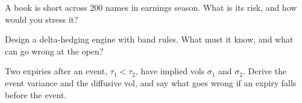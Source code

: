 \begin{interviewq}\label{iq:s2:gamma-scalping-and-event-volatility:4}
A book is short  across 200 names in earnings season. What is its risk, and how would you stress it?
\end{interviewq}

\begin{interviewq}\label{iq:s2:gamma-scalping-and-event-volatility:5}
Design a delta-hedging engine with band rules. What must it know, and what can go wrong at the open?
\end{interviewq}

\begin{interviewq}\label{iq:s2:gamma-scalping-and-event-volatility:6}
Two expiries after an event, $\tau_1 < \tau_2$, have implied vols $\sigma_1$ and $\sigma_2$. Derive the event variance and the diffusive vol, and
say what goes wrong if an expiry falls before the event.
\end{interviewq}
